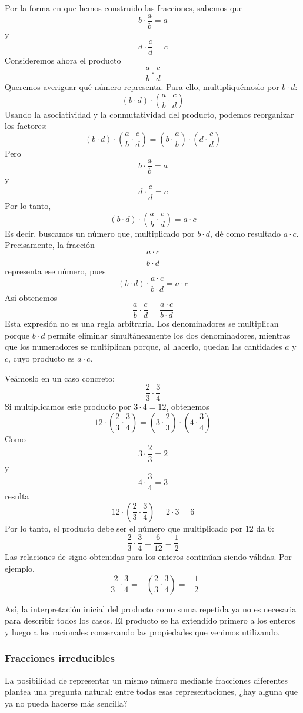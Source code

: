 Por la forma en que hemos construido las fracciones, sabemos que
\[
b\cdot\frac{a}{b}=a
\]
y
\[
d\cdot\frac{c}{d}=c
\]
Consideremos ahora el producto
\[
\frac{a}{b}\cdot\frac{c}{d}
\]
Queremos averiguar qué número representa. Para ello, multipliquémoslo por \(b\cdot d\):
\[
(b\cdot d)\cdot
\left(
\frac{a}{b}\cdot\frac{c}{d}
\right)
\]
Usando la asociatividad y la conmutatividad del producto, podemos reorganizar los factores:
\[
(b\cdot d)\cdot
\left(
\frac{a}{b}\cdot\frac{c}{d}
\right)
=
\left(
b\cdot\frac{a}{b}
\right)
\cdot
\left(
d\cdot\frac{c}{d}
\right)
\]
Pero
\[
b\cdot\frac{a}{b}=a
\]
y
\[
d\cdot\frac{c}{d}=c
\]
Por lo tanto,
\[
(b\cdot d)\cdot
\left(
\frac{a}{b}\cdot\frac{c}{d}
\right)
=
a\cdot c
\]
Es decir, buscamos un número que, multiplicado por \(b\cdot d\), dé como resultado \(a\cdot c\). Precisamente, la fracción
\[
\frac{a\cdot c}{b\cdot d}
\]
representa ese número, pues
\[
(b\cdot d)\cdot
\frac{a\cdot c}{b\cdot d}
=
a\cdot c
\]
Así obtenemos
\[
\boxed{
\frac{a}{b}\cdot\frac{c}{d}
=
\frac{a\cdot c}{b\cdot d}
}
\]
Esta expresión no es una regla arbitraria. Los denominadores se multiplican porque \(b\cdot d\) permite eliminar simultáneamente los dos denominadores, mientras que los numeradores se multiplican porque, al hacerlo, quedan las cantidades \(a\) y \(c\), cuyo producto es \(a\cdot c\).

Veámoslo en un caso concreto:
\[
\frac23\cdot\frac34
\]
Si multiplicamos este producto por \(3\cdot4=12\), obtenemos
\[
12\cdot
\left(
\frac23\cdot\frac34
\right)
=
\left(
3\cdot\frac23
\right)
\cdot
\left(
4\cdot\frac34
\right)
\]
Como
\[
3\cdot\frac23=2
\]
y
\[
4\cdot\frac34=3
\]
resulta
\[
12\cdot
\left(
\frac23\cdot\frac34
\right)
=
2\cdot3
=
6
\]
Por lo tanto, el producto debe ser el número que multiplicado por \(12\) da \(6\):
\[
\frac23\cdot\frac34
=
\frac6{12}
=
\frac12
\]
Las relaciones de signo obtenidas para los enteros continúan siendo válidas. Por ejemplo,
\[
\frac{-2}{3}\cdot\frac34
=
-\left(
\frac23\cdot\frac34
\right)
=
-\frac12
\]

Así, la interpretación inicial del producto como suma repetida ya no es necesaria para describir todos los casos. El producto se ha extendido primero a los enteros y luego a los racionales conservando las propiedades que venimos utilizando.

\subsubsection{Fracciones irreducibles}

La posibilidad de representar un mismo número mediante fracciones diferentes
plantea una pregunta natural: entre todas esas representaciones, ¿hay alguna que
ya no pueda hacerse más sencilla?

